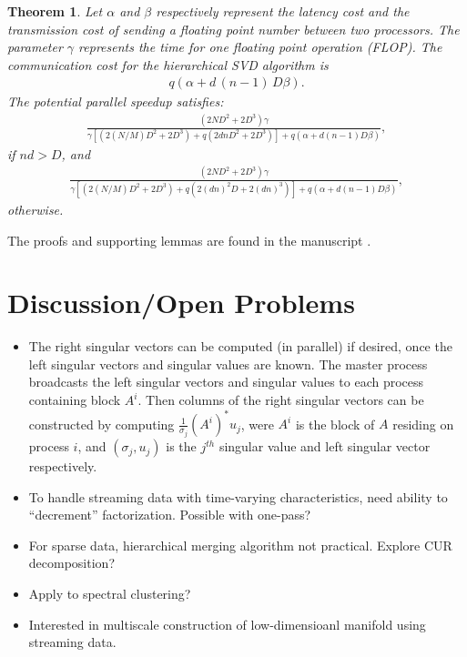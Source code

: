 \documentclass[a0,landscape]{a0poster}
\newtheorem{thm}{Theorem}
\begin{document}
\begin{multicols}{4}
\begin{thm}
  Let $\alpha$ and $\beta$ respectively represent the latency cost and
  the transmission cost of sending a floating point number between two
  processors.  The parameter $\gamma$ represents the time for one
  floating point operation (FLOP).  The communication cost for the
  hierarchical SVD algorithm is
  \begin{align*}
    q\left(\alpha  + d\,(n-1)\,D\beta\right).
  \end{align*}
  The potential parallel speedup satisfies:
  \begin{align*}
  \frac{(2 ND^2 + 2 D^3)\gamma} {\gamma\left[(2 (N/M)D^2 + 2D^3) + q(2dnD^2
      + 2D^3)\right] +q (\alpha + d(n-1)D\beta)},
  \end{align*}
  if $ nd > D$, and 
  \begin{align*}
    \frac{(2 ND^2 + 2 D^3)\gamma} {\gamma\left[(2 (N/M)D^2 + 2D^3) + q(2(dn)^2D
        + 2(dn)^3)\right] +q (\alpha + d(n-1)D\beta)},
  \end{align*}
  otherwise.
\end{thm}
\noindent The proofs and supporting lemmas are found in the manuscript
\cite{doi:10.1137/16M1058467}.

\section*{Discussion/Open Problems}
\begin{itemize}[noitemsep]
\item The right singular vectors can be computed (in parallel) if
  desired, once the left singular vectors and singular values are
  known.  The master process broadcasts the left singular vectors and
  singular values to each process containing block $A^i$.  Then
  columns of the right singular vectors can be constructed by
  computing $\frac{1}{\sigma_j}(A^i)^* u_j$, were $A^i$ is the block
  of $A$ residing on process $i$, and $(\sigma_j,u_j)$ is the $j^{th}$
  singular value and left singular vector respectively.

\item To handle streaming data with time-varying characteristics, need
  ability to ``decrement'' factorization.  Possible with one-pass?
\item For sparse data, hierarchical merging algorithm not practical.
  Explore CUR decomposition?
\item Apply to spectral clustering?
\item Interested in multiscale construction of low-dimensioanl
  manifold using streaming data.
\end{itemize}
\nocite{*} %


\end{multicols}
\end{document}
